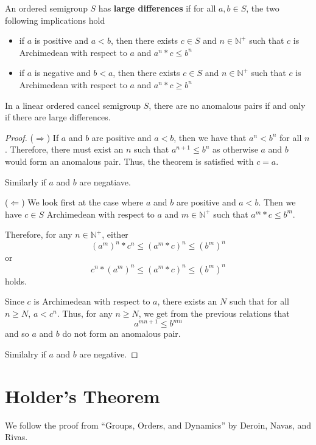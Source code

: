 \begin{definition}\label{def:has_large_differences}\leanok
An ordered semigroup $S$ has \textbf{large differences} if
for all $a,b\in S$, the two following implications hold
\begin{itemize}
\item if $a$ is positive and $a<b$, then there exists $c\in S$
and $n\in \mathbb{N}^+$ such that $c$ is Archimedean with respect to $a$
and $a^n*c \le b^n$
\item if $a$ is negative and $b < a$, then there exists $c\in S$
and $n\in \mathbb{N}^+$ such that $c$ is Archimedean with respect to $a$
and $a^n*c \ge b^n$
\end{itemize}
\end{definition}

\begin{theorem}\leanok
{}
In a linear ordered cancel semigroup $S$, there are no anomalous pairs
if and only if there are large differences.
\end{theorem}
\begin{proof}
($\Rightarrow$)
If $a$ and $b$ are positive and $a < b$, then we have that $a^n < b^n$ for all $n$.
Therefore, there must exist an $n$ such that $a^{n+1} \le b^n$
as otherwise $a$ and $b$ would form an anomalous pair.
Thus, the theorem is satisfied with $c = a$.

Similarly if $a$ and $b$ are negatiave.

($\Leftarrow$)
We look first at the case where $a$ and $b$ are positive and $a < b$.
Then we have $c\in S$ Archimedean with respect to $a$ and $m\in \mathbb{N}^+$ such that
$a^m * c \le b^m$.

Therefore, for any $n \in \mathbb{N}^+$,
either
\[(a^m)^n * c^n \le (a^m*c)^n \le (b^m)^n\]
or
\[c^n * (a^m)^n \le (a^m*c)^n \le (b^m)^n\]
holds.

Since $c$ is Archimedean with respect to $a$, there exists an $N$
such that for all $n \ge N$, $a < c^n$. Thus, for any $n \ge N$,
we get from the previous relations that
\[a^{mn + 1} \le b^{mn}\]
and so $a$ and $b$ do not form an anomalous pair.

Similalry if $a$ and $b$ are negative.
\end{proof}

\section{Holder's Theorem}
We follow the proof from ``Groups, Orders, and Dynamics'' by Deroin, Navas, and Rivas.

